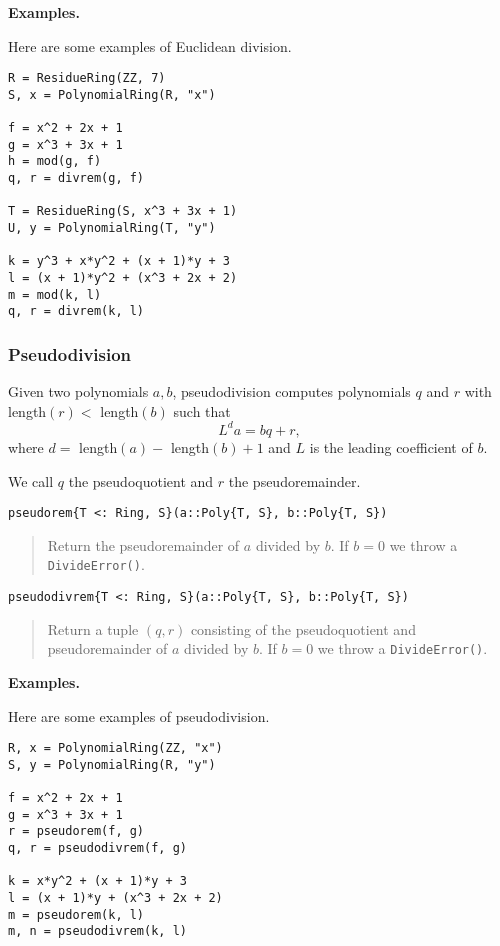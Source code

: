 \documentclass[a4paper,10pt]{article}
\newcommand{\code}{\lstinline}
\newcommand{\desc}[1]{\vspace{-3mm}\begin{quote}#1\end{quote}}
\begin{document}
{{\textbf{Examples.}

Here are some examples of Euclidean division.

\begin{lstlisting}
R = ResidueRing(ZZ, 7)
S, x = PolynomialRing(R, "x")

f = x^2 + 2x + 1
g = x^3 + 3x + 1
h = mod(g, f)
q, r = divrem(g, f)

T = ResidueRing(S, x^3 + 3x + 1)
U, y = PolynomialRing(T, "y")

k = y^3 + x*y^2 + (x + 1)*y + 3
l = (x + 1)*y^2 + (x^3 + 2x + 2)
m = mod(k, l)
q, r = divrem(k, l)
\end{lstlisting}

\subsubsection{Pseudodivision}

Given two polynomials $a, b$, pseudodivision computes polynomials $q$ and $r$
with length$(r) <$ length$(b)$ such that
$$L^d a = bq + r,$$
where $d =$ length$(a) -$ length$(b) + 1$ and $L$ is the leading coefficient
of $b$.

We call $q$ the pseudoquotient and $r$ the pseudoremainder.

\begin{lstlisting}
pseudorem{T <: Ring, S}(a::Poly{T, S}, b::Poly{T, S})
\end{lstlisting}

\desc{Return the pseudoremainder of $a$ divided by $b$. If $b = 0$ we throw a 
\code{DivideError()}.}

\begin{lstlisting}
pseudodivrem{T <: Ring, S}(a::Poly{T, S}, b::Poly{T, S})
\end{lstlisting}

\desc{Return a tuple $(q, r)$ consisting of the pseudoquotient and pseudoremainder 
of $a$ divided by $b$. If $b = 0$ we throw a \code{DivideError()}.}

\textbf{Examples.}

Here are some examples of pseudodivision.

\begin{lstlisting}
R, x = PolynomialRing(ZZ, "x")
S, y = PolynomialRing(R, "y")

f = x^2 + 2x + 1
g = x^3 + 3x + 1
r = pseudorem(f, g)
q, r = pseudodivrem(f, g)

k = x*y^2 + (x + 1)*y + 3
l = (x + 1)*y + (x^3 + 2x + 2)
m = pseudorem(k, l)
m, n = pseudodivrem(k, l)
\end{lstlisting}

}}
\end{document}
